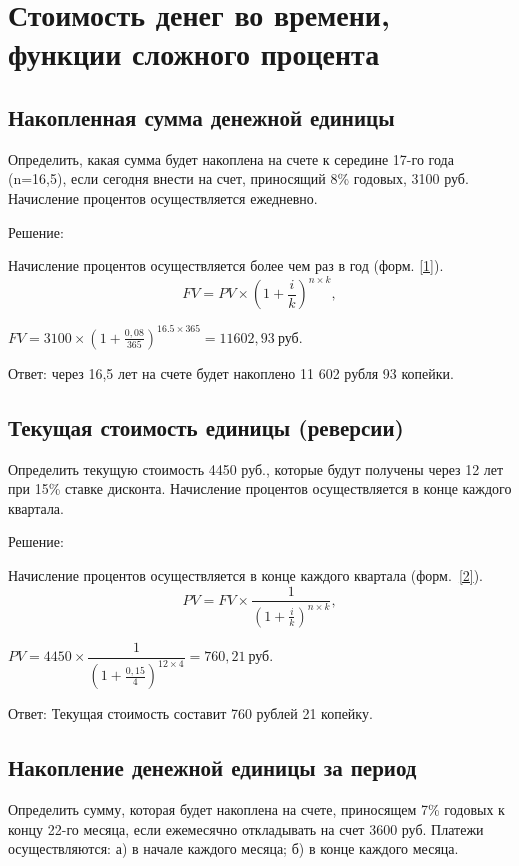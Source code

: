 \section{Стоимость денег во времени, функции сложного процента}
\subsection{Накопленная сумма денежной единицы}

Определить, какая сумма будет накоплена на счете к середине 17-го года (n=16,5), если сегодня внести на счет, приносящий 8\% годовых, 3100 руб. Начисление процентов осуществляется ежедневно.

Решение:

Начисление процентов осуществляется более чем раз в год (форм. \ref{1}).
\begin{equation}\label{1}
FV = PV \times(1+\frac{i}{k})^{n \times k},
\end{equation}

$ FV = 3100 \times (1+\frac{0,08}{365})^{16.5 \times 365} =11602,93\  \text{руб.} $

Ответ: через 16,5 лет на счете будет накоплено 11 602 рубля 93 копейки.

\subsection{Текущая стоимость единицы (реверсии)}

Определить текущую стоимость 4450 руб., которые будут получены через 12 лет при 15\% ставке дисконта. Начисление процентов осуществляется в конце каждого квартала.

Решение:

Начисление процентов осуществляется в конце каждого квартала (форм.\ \ref{2}).
\begin{equation}\label{2}
PV = FV \times \dfrac{1}{(1+\frac{i}{k})^{n \times k}},
\end{equation}

$ PV = 4450 \times \dfrac{1}{(1+\frac{0,15}{4})^{12 \times 4}} = 760,21\  \text{руб.}   $
	
Ответ: Текущая стоимость составит 760 рублей 21 копейку.

\subsection{Накопление денежной единицы за период}

Определить сумму, которая будет накоплена на счете, приносящем 7\% годовых к концу 22-го месяца, если ежемесячно откладывать на счет 3600 руб. Платежи осуществляются: а) в начале каждого месяца; б) в конце каждого месяца.

